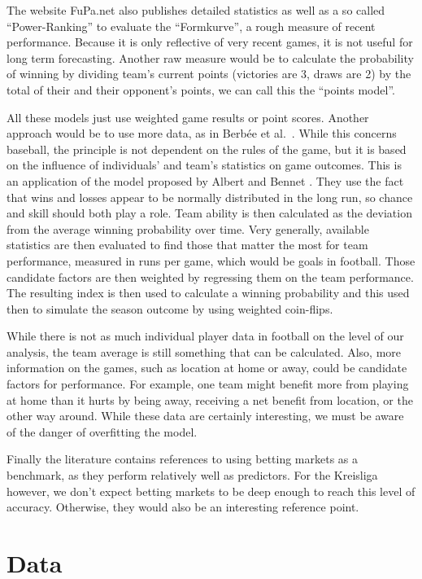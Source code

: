 \documentclass[12pt,a4paper]{article}
\begin{document}
The website FuPa.net \autocite*{fupa} also publishes detailed statistics
as well as a so called \enquote{Power-Ranking} to evaluate the
\enquote{Formkurve}, a rough measure of recent performance. Because it
is only reflective of very recent games, it is not useful for long term
forecasting. Another raw measure would be to calculate the probability
of winning by dividing team's current points (victories are 3, draws are
2) by the total of their and their opponent's points, we can call this
the \enquote{points model}.

All these models just use weighted game results or point scores. Another
approach would be to use more data, as in Berbée et
al.~\autocite*{baseball}. While this concerns baseball, the principle is
not dependent on the rules of the game, but it is based on the influence
of individuals' and team's statistics on game outcomes. This is an
application of the model proposed by Albert and Bennet
\autocite*{albert2007}. They use the fact that wins and losses appear to
be normally distributed in the long run, so chance and skill should both
play a role. Team ability is then calculated as the deviation from the
average winning probability over time. Very generally, available
statistics are then evaluated to find those that matter the most for
team performance, measured in runs per game, which would be goals in
football. Those candidate factors are then weighted by regressing them
on the team performance. The resulting index is then used to calculate a
winning probability and this used then to simulate the season outcome by
using weighted coin-flips.

While there is not as much individual player data in football on the
level of our analysis, the team average is still something that can be
calculated. Also, more information on the games, such as location at
home or away, could be candidate factors for performance. For example,
one team might benefit more from playing at home than it hurts by being
away, receiving a net benefit from location, or the other way around.
While these data are certainly interesting, we must be aware of the
danger of overfitting the model.

Finally the literature contains references to using betting markets as a
benchmark, as they perform relatively well as predictors. For the
Kreisliga however, we don't expect betting markets to be deep enough to
reach this level of accuracy. Otherwise, they would also be an
interesting reference point.

\hypertarget{data}{%
\section{Data}\label{data}}
\end{document}

